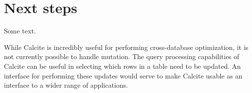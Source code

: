 \section{Next steps}
\label{sec:future}

Some text.

 While Calcite is incredibly useful for performing cross-database optimization, it is not currently possible to handle mutation.
The query processing capabilities of Calcite can be useful in selecting which rows in a table need to be updated.
An interface for performing these updates would serve to make Calcite usable as an interface to a wider range of applications.






